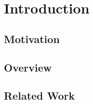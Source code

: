 
\chapter{Introduction}\label{chapter:introduction}


\section{Motivation}


\section{Overview}


\section{Related Work}